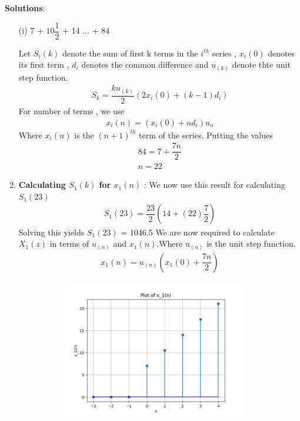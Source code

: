 \documentclass[journal,12pt,twocolumn]{IEEEtran}
\theoremstyle{remark}
\begin{document}
\vspace{0.5cm}
\textbf{Solutions}:
\begin{enumerate}
\item[(i)]   
7 + $10\dfrac{1}{2}$ + 14 ... + 84\vspace{0.05cm}
\vspace{0.2cm}

Let $S_i{(k)}$ denote the sum of first k terms in the $i^{th}$ series , $x_i(0)$ denotes its first term , $d_i$ denotes the common difference and $u_{(k)}$ denote thte unit step function.
\begin{align}
{S_k} = \dfrac{ku_{(k)}}{2}(2x_i(0) + (k-1)d_i)\label{eq:1}
\end{align}
For number of terms , we use
\begin{align}
x_i(n) = (x_i(0) + nd_i)u_n\label{eq:2}
\end{align}
Where $x_i(n)$ is the $(n+1)^{th}$ term of the series. Putting the values
\begin{align}  
84 = 7+\dfrac{7n}{2}\\
n=22
\end{align}
\item 
\textbf{Calculating $S_1(k)$ for $x_1(n)$} : 
We now use this result for calculating $S_1(23)$
\begin{align}
    S_1{(23)} = \dfrac{23}{2}(14+(22)\dfrac{7}{2})
    \end{align}
Solving this yields $S_1{(23)}$ = 1046.5\vspace{0.05cm}\vspace{0.05cm}
We are now required to calculate $X_1(z)$ in terms of $u_(n)$ and $x_1(n)$.Where u$_{(n)}$ is the unit step function.
\begin{align}
    x_1(n) = u_{(n)}(x_1(0)+\dfrac{7n}{2})
    \end{align}
    \begin{figure}[!ht]
    \centering
\graphicspath{ {figs/} }
\includegraphics[width=10cm, height=6cm]{graph_1}

\end{figure}
\end{enumerate}
\end{document}
